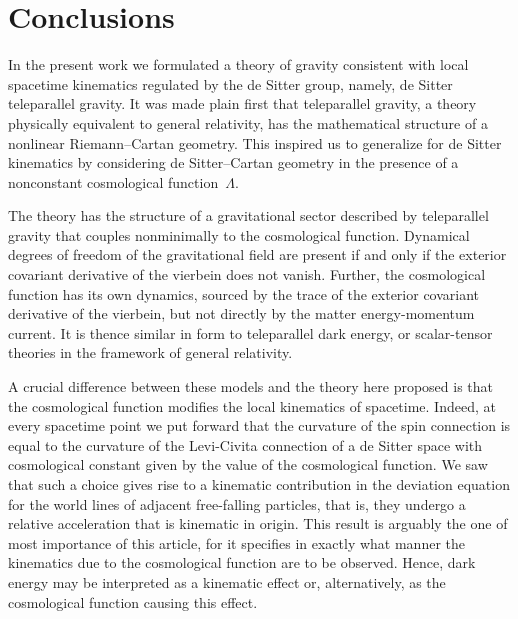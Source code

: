 \documentclass[%
aps,
prd,
reprint
]{revtex4-1}
\begin{document}
\section{Conclusions}
\label{sec:concl}

In the present work we formulated a theory of gravity consistent 
with local spacetime kinematics regulated by the de Sitter group, 
namely, de Sitter teleparallel gravity. It was made plain first 
that teleparallel gravity, a theory physically equivalent to 
general relativity, has the mathematical structure of a nonlinear 
Riemann--Cartan geometry. This inspired us to generalize for de 
Sitter kinematics by considering de Sitter--Cartan geometry in 
the presence of a nonconstant cosmological function~$\Lambda$. 

The theory has the structure of a gravitational sector described 
by teleparallel gravity that couples nonminimally to the 
cosmological function. Dynamical degrees of freedom of the 
gravitational field are present if and only if the exterior 
covariant derivative of the vierbein does not vanish.  Further, 
the cosmological function has its own dynamics, sourced by the 
trace of the exterior covariant derivative of the vierbein, but 
not directly by the matter energy-momentum current.  It is thence 
similar in form to teleparallel dark energy, or scalar-tensor 
theories in the framework of general relativity.

A crucial difference between these models and the theory here 
proposed is that the cosmological function modifies the local 
kinematics of spacetime. Indeed, at every spacetime point we put 
forward that the curvature of the spin connection is equal to the 
curvature of the Levi-Civita connection of a de Sitter space with 
cosmological constant given by the value of the cosmological 
function. We saw that such a choice gives rise to a kinematic 
contribution in the deviation equation for the world lines of 
adjacent free-falling particles, that is, they undergo a relative 
acceleration that is kinematic in origin. This result is arguably 
the one of most importance of this article, for it specifies in 
exactly what manner the kinematics due to the cosmological 
function are to be observed.  Hence, dark energy may be 
interpreted as a kinematic effect or, alternatively, as the 
cosmological function causing this effect.
\end{document}
